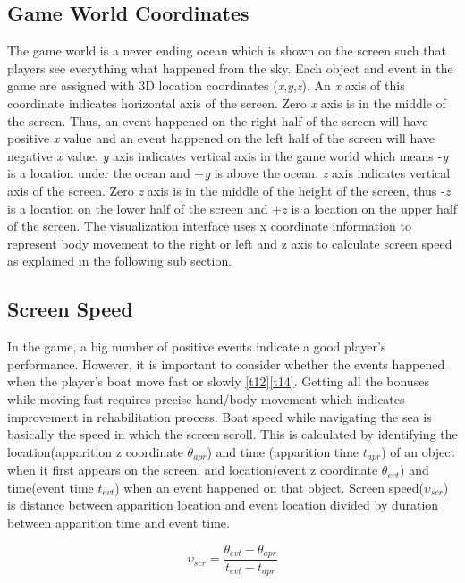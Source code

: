 \subsection{Game World Coordinates}
The game world is a never ending ocean which is shown on the screen such that players see everything what happened from the sky. Each object and event in the game are assigned with 3D location coordinates (\textit{x},\textit{y},\textit{z}). An \textit{x} axis of this coordinate indicates horizontal axis of the screen. Zero \textit{x} axis is in the middle of the screen. Thus, an event happened on the right half of the screen will have positive \textit{x} value and an event happened on the left half of the screen will have negative \textit{x} value. \textit{y} axis indicates vertical axis in the game world which means -\textit{y} is a location under the ocean and +\textit{y} is above the ocean. \textit{z} axis indicates vertical axis of the screen. Zero \textit{z} axis is in the middle of the height of the screen, thus -\textit{z} is a location on the lower half of the screen and +\textit{z} is a location on the upper half of the screen. The visualization interface uses x coordinate information to represent body movement to the right or left and z axis to calculate screen speed as explained in the following sub section.

\subsection{Screen Speed}
In the game, a big number of positive events indicate a good player's performance. However, it is important to consider whether the events happened when the player's boat move fast or slowly \ref{t12}\ref{t14}. Getting all the bonuses while moving fast requires precise hand/body movement which indicates improvement in rehabilitation process. Boat speed while navigating the sea is basically the speed in which the screen scroll. This is calculated by identifying the location(apparition z coordinate $\theta_{apr}$) and time (apparition time $\textit{t}_{apr}$) of an object when it first appears on the screen, and location(event z coordinate $\theta_{evt}$) and time(event time $\textit{t}_{evt}$) when an event happened on that object. Screen speed($\upsilon_{scr}$) is distance between apparition location and event location divided by duration between apparition time and event time.

$$ \upsilon_{scr} = \frac{\theta_{evt}-\theta_{apr}}{\textit{t}_{evt}-\textit{t}_{apr}} $$

